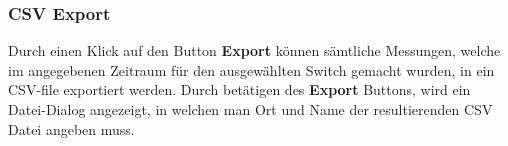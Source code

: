 \subsubsection{CSV Export}
Durch einen Klick auf den Button \textbf{Export} können sämtliche Messungen, welche im angegebenen Zeitraum für den ausgewählten Switch gemacht wurden, in ein CSV-file exportiert werden. Durch betätigen des \textbf{Export} Buttons, wird ein Datei-Dialog angezeigt, in welchen man Ort und Name der resultierenden CSV Datei angeben muss.

